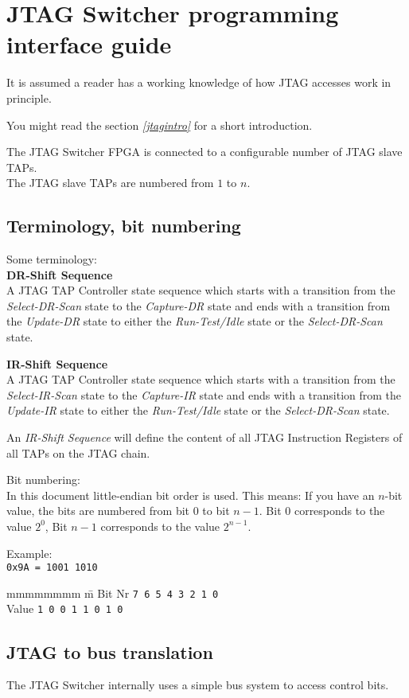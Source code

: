 \documentclass[10pt,english,a4paper]{report}
\begin{document}
\chapter{JTAG Switcher programming interface guide}
It is assumed a reader has a working knowledge of how JTAG accesses work in principle.

You might read the section {\em\ref{jtagintro} } for a short introduction.

The JTAG Switcher FPGA is connected to a configurable number of JTAG slave TAPs.\\
The JTAG slave TAPs are numbered from $1$ to $n$.

\section{Terminology, bit numbering}
Some terminology:\\
{\bf DR-Shift Sequence}\\
A JTAG TAP Controller state sequence which starts with a transition from the
{\em Select-DR-Scan} state to the {\em Capture-DR} state and ends with a transition
from the {\em Update-DR} state to either the {\em Run-Test/Idle} state or
the {\em Select-DR-Scan} state.

{\bf IR-Shift Sequence}\\
A JTAG TAP Controller state sequence which starts with a transition from the
{\em Select-IR-Scan} state to the {\em Capture-IR} state and ends with a transition
from the {\em Update-IR} state to either the {\em Run-Test/Idle} state or
the {\em Select-DR-Scan} state.

An {\em IR-Shift Sequence} will define the content of all JTAG Instruction Registers
of all TAPs on the JTAG chain.

Bit numbering:\\
In this document little-endian bit order is used. This means: If you have an $n$-bit value,
the bits are numbered from bit $0$ to bit $n-1$. Bit $0$ corresponds to the value $2^0$,
Bit $n-1$ corresponds to the value $2^{n-1}$.

Example:\\
{\tt 0x9A = 1001 1010}
\begin{tabbing}
mmmmmmmm \= m \kill
Bit Nr \> {\tt 7 6 5 4 3 2 1 0} \\
Value  \> {\tt 1 0 0 1 1 0 1 0} \\
\end{tabbing}

\newpage
\section{JTAG to bus translation}
The JTAG Switcher internally uses a simple bus system to access control bits.
\end{document}
